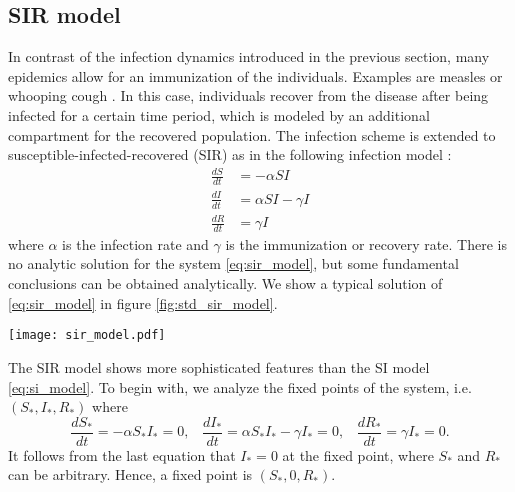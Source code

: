 \subsection{SIR model}\label{sec:sir_model}
In contrast of the infection dynamics introduced in the previous section, many epidemics allow for an immunization of the individuals.
Examples are measles or whooping cough \citep{grenfell:92} \citep{andersonmay:92}.
In this case, individuals recover from the disease after being infected for a certain time period, which is modeled by an additional compartment for the recovered population.
The infection scheme is extended to susceptible-infected-recovered (SIR) as in the following infection model \citep{kermack:27}:
\begin{align}\label{eq:sir_model}
\frac{dS}{dt} &= -\alpha SI \nonumber \\
\frac{dI}{dt} &= \alpha SI -\gamma I \nonumber \\
\frac{dR}{dt} &= \gamma I
\end{align}
where $\alpha $ is the infection rate and $\gamma $ is the immunization or recovery rate.
There is no analytic solution for the system \eqref{eq:sir_model}, but some fundamental conclusions can be obtained analytically.
We show a typical solution of \eqref{eq:sir_model} in figure \ref{fig:std_sir_model}.
%
\begin{SCfigure}%
\texttt{[image: sir\_model.pdf]}
\caption{Solution of the susceptible-infected-recovered (SIR) model \eqref{eq:sir_model}.
The number of infected shows that the spreading process is a single event.
Note that a fraction of the population is still susceptible at the end of the process.
Parameters: $\alpha = 3$, $\gamma = 1$, $N=300$, $S_0=1$.}
\label{fig:std_sir_model}
\end{SCfigure}
%


The SIR model shows more sophisticated features than the SI model \eqref{eq:si_model}.
To begin with, we analyze the fixed points of the system, i.e. $(S_*,I_*,R_*)$ where
\begin{equation}
\frac{dS_*}{dt} = -\alpha S_*I_* =0 ,\; \;\;
\frac{dI_*}{dt} = \alpha S_*I_* -\gamma I_* =0,\; \;\;
\frac{dR_*}{dt} = \gamma I_* = 0.
\end{equation}
It follows from the last equation that $I_*=0$ at the fixed point, where $S_*$ and $R_*$ can be arbitrary.
Hence, a fixed point is $(S_*,0,R_*)$.

